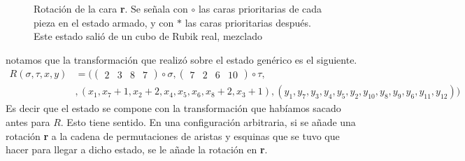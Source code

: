 \documentclass{article}
\theoremstyle{definition}
\renewcommand{\r}{\textbf{r}}
\renewcommand{\l}{\textbf{l}}
\begin{document}
\begin{figure}
    \caption{Rotación de la cara \r. Se señala con $\circ$ las caras prioritarias de cada pieza en el estado armado, y con $*$ las caras prioritarias después. Este estado salió de un cubo de Rubik real, mezclado}
    \label{fig:rotacion_de_la_cara_r_generica}
\end{figure}
notamos que la transformación que realizó sobre el estado genérico es el siguiente.
\begin{align*}
    R(\sigma,\tau,x,y) & =\big(\begin{pmatrix}
                                   2 & 3 & 8 & 7
                               \end{pmatrix}\circ \sigma,\begin{pmatrix}
                                                             7 & 2 & 6 & 10
                                                         \end{pmatrix}\circ \tau, \\&,(x_1,x_7+1,x_2+2,x_4,x_5,x_6,x_8+2,x_3+1),(y_1,y_7,y_3,y_4,y_5,y_2,y_{10},y_8,y_9,y_{6},y_{11},y_{12})\big)
\end{align*}
Es decir que el estado se compone con la transformación que habíamos sacado antes para $R$. Esto tiene sentido. En una configuración arbitraria, si se añade una rotación \r{} a la cadena de permutaciones de aristas y esquinas que se tuvo que hacer para llegar a dicho estado, se le añade la rotación en \r{}.
\end{document}
